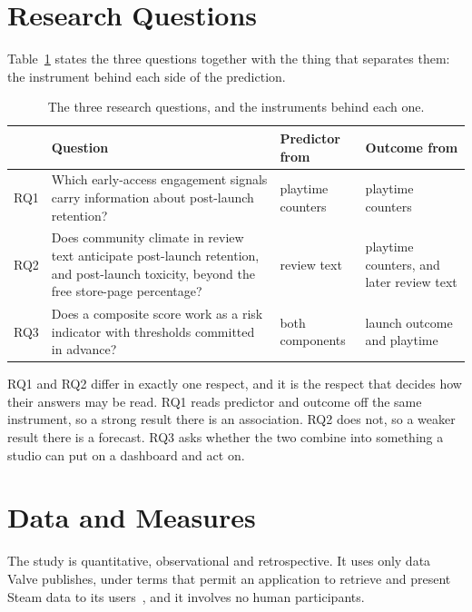 \documentclass[sigconf]{acmart}
\begin{document}
\section{Research Questions}
\label{sec:rqs}

Table~\ref{tab:rqs} states the three questions together with the thing that separates them: the
instrument behind each side of the prediction.

\begin{table}[t]
\centering
\caption{The three research questions, and the instruments behind each one.}
\label{tab:rqs}
\footnotesize
\begin{tabular}{@{}p{0.25cm}p{3.1cm}p{1.6cm}p{1.75cm}@{}}
\toprule
& \textbf{Question} & \textbf{Predictor from} & \textbf{Outcome from} \\
\midrule
RQ1 & Which early-access engagement signals carry information about post-launch retention? &
playtime counters & playtime counters \\[2pt]
RQ2 & Does community climate in review text anticipate post-launch retention, and post-launch
toxicity, beyond the free store-page percentage? & review text & playtime counters, and later
review text \\[2pt]
RQ3 & Does a composite score work as a risk indicator with thresholds committed in advance? &
both components & launch outcome and playtime \\
\bottomrule
\end{tabular}
\end{table}

RQ1 and RQ2 differ in exactly one respect, and it is the respect that decides how their answers may
be read. RQ1 reads predictor and outcome off the same instrument, so a strong result there is an
association. RQ2 does not, so a weaker result there is a forecast. RQ3 asks whether the two
combine into something a studio can put on a dashboard and act on.

\section{Data and Measures}
\label{sec:data}

The study is quantitative, observational and retrospective. It uses only data Valve publishes,
under terms that permit an application to retrieve and present Steam data to its
users~\cite{ValveAPITerms}, and it involves no human participants.
\end{document}
